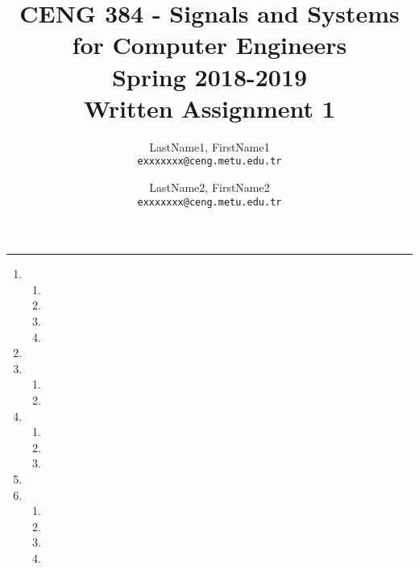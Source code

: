 \documentclass[10pt,a4paper, margin=1in]{article}
\author{
  LastName1, FirstName1\\
  \texttt{exxxxxxx@ceng.metu.edu.tr}
  \and
  LastName2, FirstName2\\
  \texttt{exxxxxxx@ceng.metu.edu.tr}
}
\title{CENG 384 - Signals and Systems for Computer Engineers \\
Spring 2018-2019 \\
Written Assignment 1}
\begin{document}
\maketitle



\noindent\rule{19cm}{1.2pt}

\begin{enumerate}

\item 
    \begin{enumerate}
    \item %
    \item %
    \item %
    \item %
    \end{enumerate}


\item %

\item      
    \begin{enumerate}
    \item %
    \item %
    \end{enumerate}

\item 
    \begin{enumerate}
    \item %
    \item %
    \item %
    \end{enumerate}

\item %


\item 
    \begin{enumerate}
    \item %
    \item %
    \item %
    \item %
    \end{enumerate}

\end{enumerate}
\end{document}
